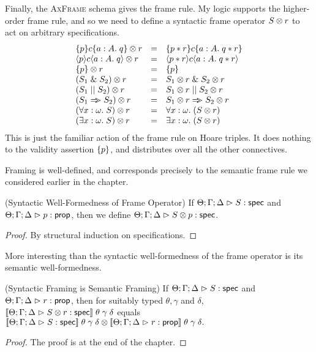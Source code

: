 Finally, the \textsc{AxFrame} schema gives the frame rule. My logic
supports the higher-order frame rule, and so we need to define a
syntactic frame operator ${S} \otimes {r}$ to act on arbitrary
specifications.
\begin{displaymath}
  \begin{array}{lcl}
    {\{{p}\}{c}\{{a:A}.\;{q}\}} \otimes {r}    & = & \{{p * r}\}{c}\{{a:A}.\;{q * r}\} \\
    {\langle{p}\rangle{c}\langle{a:A}.\;{q}\rangle} \otimes {r}   & = & \langle{p * r}\rangle{c}\langle{a:A}.\;{q * r}\rangle \\
    {\{{p}\}} \otimes {r}              & = & \{{p}\} \\
    {(S_1 \;\&\; S_2)} \otimes {r}      & = & {S_1} \otimes {r} \;\&\; {S_2} \otimes {r} \\
    {(S_1 \;||\; S_2)} \otimes {r}       & = & {S_1} \otimes {r} \;||\; {S_2} \otimes {r} \\
    {(S_1 \Rightarrow\!\!\!> S_2)} \otimes {r}      & = & {S_1} \otimes {r} \Rightarrow\!\!\!> {S_2} \otimes {r} \\
    {(\forall x:\omega.\; S)} \otimes {r} & = & \forall x:\omega.\; ({S} \otimes {r}) \\
    {(\exists x:\omega.\; S)} \otimes {r} & = & \exists x:\omega.\; ({S} \otimes {r}) \\
  \end{array}
\end{displaymath}
This is just the familiar action of the frame rule on Hoare triples. It
does nothing to the validity assertion $\{{p}\}$, and distributes over all 
the other connectives. 

Framing is well-defined, and corresponds precisely to the semantic frame rule
we considered earlier in the chapter. 

\begin{prop}{(Syntactic Well-Formedness of Frame Operator)}
If ${\Theta; \Gamma; \Delta} \vartriangleright {S} : \mathsf{spec}$ and ${\Theta; \Gamma; \Delta} \vartriangleright {p} : {\mathsf{prop}}$, then
we define ${\Theta; \Gamma; \Delta} \vartriangleright {{S} \otimes {p}} : \mathsf{spec}$.  
\end{prop}
\begin{proof}
  By structural induction on specifications.
\end{proof}

More interesting than the syntactic well-formedness of the frame
operator is its semantic well-formedness. 

\begin{lemma}{(Syntactic Framing is Semantic Framing)}
If ${\Theta; \Gamma; \Delta} \vartriangleright {S} : \mathsf{spec}$ and ${\Theta; \Gamma; \Delta} \vartriangleright {r} : {\mathsf{prop}}$, then for suitably typed $\theta, \gamma$ and $\delta$,
$[\![{{\Theta; \Gamma; \Delta} \vartriangleright {{S} \otimes {r}} : \mathsf{spec}}]\!]\;\theta\;\gamma\;\delta$ equals  \\
${[\![{{\Theta; \Gamma; \Delta} \vartriangleright {S} : \mathsf{spec}}]\!]\;\theta\;\gamma\;\delta} \otimes {[\![{{\Theta; \Gamma; \Delta} \vartriangleright {r} : {\mathsf{prop}}}]\!]\;\theta\;\gamma\;\delta}.$ 


\end{lemma}
\begin{proof}
  The proof is at the end of the chapter.
\end{proof}\\

